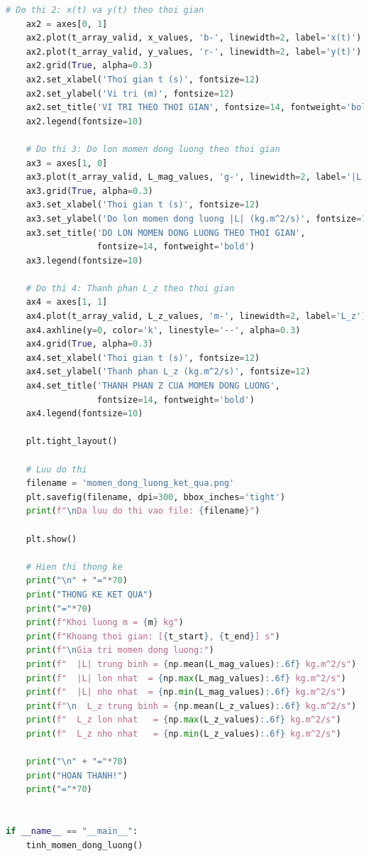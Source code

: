 \documentclass{report}
\newcounter{line}
\begin{document}
\begin{lstlisting}[language=Python, caption={Chương trình tính toán mômen động lượng}, label={code:main}]
    # Do thi 2: x(t) va y(t) theo thoi gian
    ax2 = axes[0, 1]
    ax2.plot(t_array_valid, x_values, 'b-', linewidth=2, label='x(t)')
    ax2.plot(t_array_valid, y_values, 'r-', linewidth=2, label='y(t)')
    ax2.grid(True, alpha=0.3)
    ax2.set_xlabel('Thoi gian t (s)', fontsize=12)
    ax2.set_ylabel('Vi tri (m)', fontsize=12)
    ax2.set_title('VI TRI THEO THOI GIAN', fontsize=14, fontweight='bold')
    ax2.legend(fontsize=10)
    
    # Do thi 3: Do lon momen dong luong theo thoi gian
    ax3 = axes[1, 0]
    ax3.plot(t_array_valid, L_mag_values, 'g-', linewidth=2, label='|L|')
    ax3.grid(True, alpha=0.3)
    ax3.set_xlabel('Thoi gian t (s)', fontsize=12)
    ax3.set_ylabel('Do lon momen dong luong |L| (kg.m^2/s)', fontsize=12)
    ax3.set_title('DO LON MOMEN DONG LUONG THEO THOI GIAN', 
                  fontsize=14, fontweight='bold')
    ax3.legend(fontsize=10)
    
    # Do thi 4: Thanh phan L_z theo thoi gian
    ax4 = axes[1, 1]
    ax4.plot(t_array_valid, L_z_values, 'm-', linewidth=2, label='L_z')
    ax4.axhline(y=0, color='k', linestyle='--', alpha=0.3)
    ax4.grid(True, alpha=0.3)
    ax4.set_xlabel('Thoi gian t (s)', fontsize=12)
    ax4.set_ylabel('Thanh phan L_z (kg.m^2/s)', fontsize=12)
    ax4.set_title('THANH PHAN Z CUA MOMEN DONG LUONG', 
                  fontsize=14, fontweight='bold')
    ax4.legend(fontsize=10)
    
    plt.tight_layout()
    
    # Luu do thi
    filename = 'momen_dong_luong_ket_qua.png'
    plt.savefig(filename, dpi=300, bbox_inches='tight')
    print(f"\nDa luu do thi vao file: {filename}")
    
    plt.show()
    
    # Hien thi thong ke
    print("\n" + "="*70)
    print("THONG KE KET QUA")
    print("="*70)
    print(f"Khoi luong m = {m} kg")
    print(f"Khoang thoi gian: [{t_start}, {t_end}] s")
    print(f"\nGia tri momen dong luong:")
    print(f"  |L| trung binh = {np.mean(L_mag_values):.6f} kg.m^2/s")
    print(f"  |L| lon nhat  = {np.max(L_mag_values):.6f} kg.m^2/s")
    print(f"  |L| nho nhat  = {np.min(L_mag_values):.6f} kg.m^2/s")
    print(f"\n  L_z trung binh = {np.mean(L_z_values):.6f} kg.m^2/s")
    print(f"  L_z lon nhat   = {np.max(L_z_values):.6f} kg.m^2/s")
    print(f"  L_z nho nhat   = {np.min(L_z_values):.6f} kg.m^2/s")
    
    print("\n" + "="*70)
    print("HOAN THANH!")
    print("="*70)


if __name__ == "__main__":
    tinh_momen_dong_luong()
\end{lstlisting}
\end{document}
